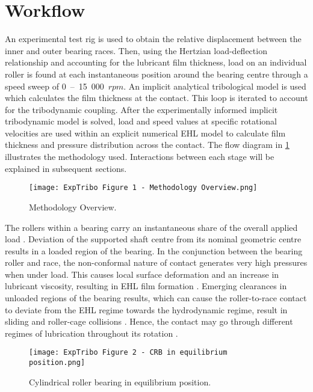 \section{Workflow}

An experimental test rig is used to obtain the relative displacement between the inner and outer bearing races. Then, using the Hertzian load-deflection relationship and accounting for the lubricant film thickness, load on an individual roller is found at each instantaneous position around the bearing centre through a speed sweep of 0~–~15~000~$rpm$. An implicit analytical tribological model is used which calculates the film thickness at the contact. This loop is iterated to account for the tribodynamic coupling. After the experimentally informed implicit tribodynamic model is solved, load and speed values at specific rotational velocities are used within an explicit numerical EHL model to calculate film thickness and pressure distribution across the contact. The flow diagram in \ref{Experimental Tribodynamics Methodology Overview} illustrates the methodology used. Interactions between each stage will be explained in subsequent sections.

\begin{figure}
	\centering
    \texttt{[image: ExpTribo Figure 1 - Methodology Overview.png]}
	\caption{Methodology Overview.}
	\label{Experimental Tribodynamics Methodology Overview}
\end{figure}

The rollers within a bearing carry an instantaneous share of the overall applied load \cite{Guo2020}. Deviation of the supported shaft centre from its nominal geometric centre results in a loaded region of the bearing. In the conjunction between the bearing roller and race, the non-conformal nature of contact generates very high pressures when under load. This causes local surface deformation and an increase in lubricant viscosity, resulting in EHL film formation \cite{Gohar1988} \cite{Grubin1949}. Emerging clearances in unloaded regions of the bearing results, which can cause the roller-to-race contact to deviate from the EHL regime towards the hydrodynamic regime, result in sliding and roller-cage collisions \cite{Mohammadpour2015c}. Hence, the contact may go through different regimes of lubrication throughout its rotation \cite{Denni2019}.

\begin{figure}
	\centering
	\texttt{[image: ExpTribo Figure 2 - CRB in equilibrium position.png]}
	\caption{Cylindrical roller bearing in equilibrium position.}
	\label{CRB in equilibrium position}
\end{figure}

